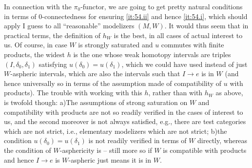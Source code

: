 In connection with the $\pi_0$-functor, we are going to get pretty
natural conditions in terms of $0$-connectedness for ensuring
\ref{it:54.ii} and hence \ref{it:54.i}, which should apply I guess to
all ``reasonable'' modelizers $(M,W)$. It would thus seem that in
practical terms, the definition of $h_W$ is the best, in all cases of
actual interest to us. Of course, in case $W$ is strongly saturated
and $u$ commutes with finite products, the widest $h$ is the one whose
weak homotopy intervals are triples $(I,\delta_0,\delta_1)$ satisfying
$u(\delta_0)=u(\delta_1)$, which we could have used instead of just
$W$-aspheric intervals, which are also the intervals such
that $I\to e$ is in $W$ (and hence universally so in terms of the
assumption made of compatibility of $u$ with products).  The trouble
with working with this $h$, rather than with $h_W$ as above, is
twofold though: a)\enspace The assumptions of strong saturation on $W$
and compatibility with products are not so readily verified in the
cases of interest to us, and the second moreover is not always
satisfied, e.g., there are test categories which are not strict, i.e.,
elementary modelizers which are not strict; b)\enspace the condition
$u(\delta_0)=u(\delta_1)$ is not readily verified in terms of $W$
directly, whereas the condition of $W$-asphericity is -- still more so
if $W$ is compatible with products and hence $I\to e$ is $W$-aspheric
just means it is in $W$.

